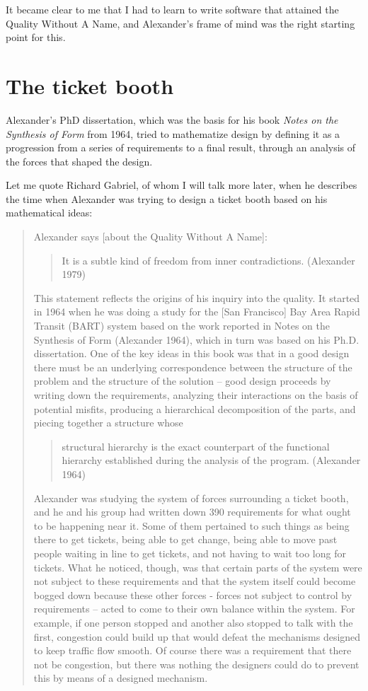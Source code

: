 It became clear to me that I had to learn to write software that attained the
Quality Without A Name, and Alexander's frame of mind was the right starting
point for this.

\section*{The ticket booth}

Alexander's PhD dissertation, which was the basis for his book \textit{Notes on
the Synthesis of Form} from 1964, tried to mathematize design by defining it as
a progression from a series of requirements to a final result, through an
analysis of the forces that shaped the design.

Let me quote Richard Gabriel, of whom I will talk more later, when he describes
the time when Alexander was trying to design a ticket booth based on his
mathematical ideas:
\begin{quote}
Alexander says [about the Quality Without A Name]:
\begin{quote}
It is a subtle kind of freedom from inner contradictions. (Alexander 1979)      
                                                                   \end{quote}
This statement reflects the origins of his inquiry into the quality. It started
in 1964 when he was doing a study for the [San Francisco] Bay Area Rapid Transit
(BART) system based on the work reported in Notes on the Synthesis of Form
(Alexander 1964), which in turn was based on his Ph.D. dissertation. One of the
key ideas in this book was that in a good design there must be an underlying
correspondence between the structure of the problem and the structure of the
solution -- good design proceeds by writing down the requirements, analyzing
their interactions on the basis of potential misfits, producing a hierarchical
decomposition of the parts, and piecing together a structure whose
\begin{quote}
structural hierarchy is the exact counterpart of the functional hierarchy
established during the analysis of the program. (Alexander 1964)\end{quote} 
Alexander was studying the system of forces surrounding a ticket booth, and he
and his group had written down 390 requirements for what ought to be happening
near it. Some of them pertained to such things as being there to get tickets,
being able to get change, being able to move past people waiting in line to get
tickets, and not having to wait too long for tickets. What he noticed, though,
was that certain parts of the system were not subject to these requirements and
that the system itself could become bogged down because these other forces -
forces not subject to control by requirements -- acted to come to their own
balance within the system. For example, if one person stopped and another also
stopped to talk with the first, congestion could build up that would defeat the
mechanisms designed to keep traffic flow smooth. Of course there was a
requirement that there not be congestion, but there was nothing the designers
could do to prevent this by means of a designed mechanism.
\end{quote} 
